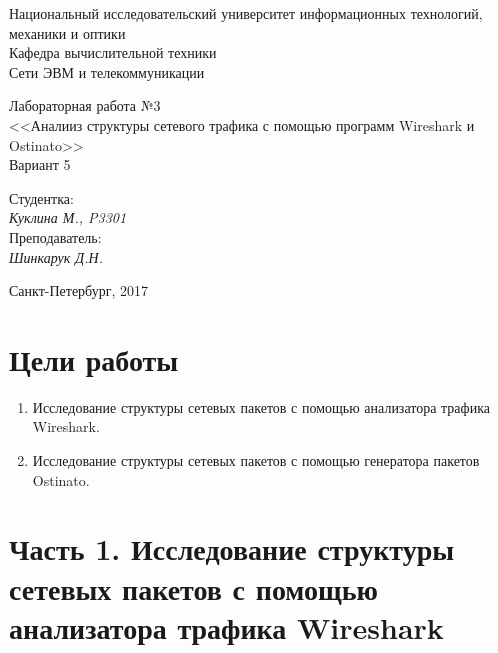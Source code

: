 \documentclass[12pt, a4paper] {ncc}
\begin{document}
\frenchspacing
\pagestyle{empty}
\begin{center}
     Национальный исследовательский университет информационных технологий,
                              механики и оптики\\
                        Кафедра вычислительной техники\\
                          Сети ЭВМ и телекоммуникации
\end{center}
\begin{center}
                            Лабораторная работа №3\\
                <<Аналииз структуры сетевого трафика с помощью программ Wireshark и Ostinato>>\\
                                Вариант 5
\end{center}
\begin{flushright}
                                          Студентка:\\
                                                         {\it Куклина М., P3301} \\
                                          Преподаватель:\\
                                                         {\it Шинкарук Д.Н. }
\end{flushright}
\begin{center}
                             Санкт-Петербург, 2017
\end{center}
\newpage


\section*{Цели работы}
\begin{enumerate}
    \item Исследование структуры сетевых пакетов с помощью анализатора трафика Wireshark.
    \item Исследование структуры сетевых пакетов с помощью генератора пакетов Ostinato.
\end{enumerate}

\section*{Часть 1. Исследование структуры сетевых пакетов с помощью анализатора трафика Wireshark}
\end{document}
